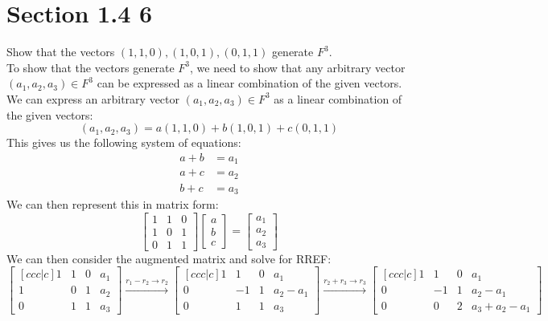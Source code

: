 \documentclass{article}
\begin{document}
\section*{Section 1.4 6}
Show that the vectors $(1,1,0), (1,0,1), (0,1,1)$ generate $F^3$.\\
To show that the vectors generate $F^3$, we need to show that any arbitrary vector $(a_1,a_2,a_3) \in F^3$ can be expressed as a linear combination of the given vectors.\\
We can express an arbitrary vector $(a_1,a_2,a_3) \in F^3$ as a linear combination of the given vectors: 
$$ (a_1,a_2,a_3) = a(1,1,0) + b(1,0,1) + c(0,1,1)$$
This gives us the following system of equations:
\begin{align*}
    a + b &= a_1 \\
    a + c &= a_2 \\
    b + c &= a_3
\end{align*}
We can then represent this in matrix form:
$$ \begin{bmatrix}
    1 & 1 & 0 \\
    1 & 0 & 1 \\
    0 & 1 & 1
\end{bmatrix} \begin{bmatrix}
    a \\ b \\ c
\end{bmatrix} = \begin{bmatrix}
    a_1 \\ a_2 \\ a_3
\end{bmatrix} $$
We can then consider the augmented matrix and solve for RREF:
$$ \begin{bmatrix}[ccc|c]
    1 & 1 & 0 & a_1\\
    1 & 0 & 1 & a_2\\
    0 & 1 & 1 & a_3
\end{bmatrix} \xrightarrow{r_1 - r_2 \rightarrow r_2} \begin{bmatrix}[ccc|c]
    1 & 1 & 0 & a_1\\
    0 & -1 & 1 & a_2 - a_1\\
    0 & 1 & 1 & a_3
\end{bmatrix} \xrightarrow{r_2 + r_3 \rightarrow r_3} \begin{bmatrix}[ccc|c]
    1 & 1 & 0 & a_1\\
    0 & -1 & 1 & a_2 - a_1\\
    0 & 0 & 2 & a_3 + a_2 - a_1
\end{bmatrix}$$
\end{document}
